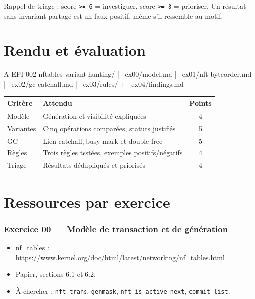 \documentclass{training}
\begin{document}
Rappel de triage : score \texttt{>= 6} = investiguer, score
\texttt{>= 8} = prioriser. Un résultat sans invariant partagé est un faux
positif, même s'il ressemble au motif.

\chapter{Rendu et évaluation}

\begin{console}
A-EPI-002-nftables-variant-hunting/
|-- ex00/model.md
|-- ex01/nft-byteorder.md
|-- ex02/gc-catchall.md
|-- ex03/rules/
+-- ex04/findings.md
\end{console}

\begin{center}
\begin{tabularx}{\linewidth}{|l|X|c|}
\hline
\textbf{Critère} & \textbf{Attendu} & \textbf{Points} \\ \hline
Modèle & Génération et visibilité expliquées & 4 \\ \hline
Variantes & Cinq opérations comparées, statuts justifiés & 5 \\ \hline
GC & Lien catchall, busy mark et double free & 5 \\ \hline
Règles & Trois règles testées, exemples positifs/négatifs & 4 \\ \hline
Triage & Résultats dédupliqués et priorisés & 4 \\ \hline
\end{tabularx}
\end{center}

\chapter{Ressources par exercice}

\subsection*{Exercice 00 --- Modèle de transaction et de génération}
\begin{itemize}
  \item nf\_tables :
        \url{https://www.kernel.org/doc/html/latest/networking/nf_tables.html}
  \item Papier, sections 6.1 et 6.2.
  \item À chercher : \texttt{nft\_trans}, \texttt{genmask},
        \texttt{nft\_is\_active\_next}, \texttt{commit\_list}.
\end{itemize}
\end{document}
